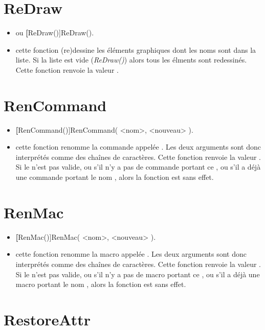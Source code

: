 \section{ReDraw}\label{cmdReDraw}

\begin{itemize}
 \item \util {} ou \textbf[ReDraw()]{ReDraw()}.
 \item \desc cette fonction (re)dessine les éléments graphiques dont les noms sont dans la liste. Si la liste est vide (\textsl{ReDraw()}) alors tous les élments sont redessinés. Cette fonction renvoie la valeur \Nil.
\end{itemize}

\section{RenCommand}\label{cmdRenCommand}

\begin{itemize}
 \item \util \textbf[RenCommand()]{RenCommand( <nom>, <nouveau> )}.
 \item \desc cette fonction renomme la commande appelée . Les deux arguments sont donc interprétés comme des chaînes de caractères. Cette fonction renvoie la valeur \Nil. Si le  n'est pas valide, ou s'il n'y a pas de commande portant ce , ou s'il a déjà une commande portant le nom , alors la fonction est sans effet. 
\end{itemize}

\section{RenMac}\label{cmdRenMac}

\begin{itemize}
 \item \util \textbf[RenMac()]{RenMac( <nom>, <nouveau> )}.
 \item \desc cette fonction renomme la macro appelée . Les deux arguments sont donc interprétés comme des chaînes de caractères. Cette fonction renvoie la valeur \Nil. Si le  n'est pas valide, ou s'il n'y a pas de macro portant ce , ou s'il a déjà une macro portant le nom , alors la fonction est sans effet.
\end{itemize}


\section{RestoreAttr}\label{cmdRestoreAttr}

